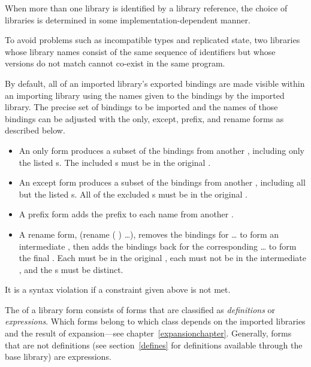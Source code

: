 When more than one library is identified by a library reference, the
choice of libraries is determined in some implementation-dependent manner.

To avoid problems such as incompatible types and replicated state, two
libraries whose library names consist of the same sequence of identifiers but
whose versions do not match cannot co-exist in the same program.

By default, all of an imported library's exported bindings are made
visible within an importing library using the names given to the bindings
by the imported library.
The precise set of bindings to be imported and the names of those
bindings can be adjusted with the {\cf only}, {\cf except},
{\cf prefix}, and {\cf rename} forms as described below.

\begin{itemize}
\item An {\cf only} form produces a subset of the bindings from another
, including only the listed
s.
The included s must be in
the original .
\item An {\cf except} form produces a subset of the bindings from another
, including all but the listed
s.
All of the excluded s must be in
the original .
\item A {\cf prefix} form adds the  prefix to each
name from another .
\item A {\cf rename} form, {\cf (rename ( ) \ldots)},
removes the bindings for {\cf {} \ldots} to form an
intermediate , then adds the bindings back for the
corresponding {\cf {} \ldots} to form the final
.
Each  must be in the original ,
each  must not be in the intermediate ,
and the s must be distinct.
\end{itemize}
It is a syntax violation if a constraint given above is not met.

\label{librarybodysection}
The  of a {\cf library} form consists of forms
that are classified as 
\textit{definitions} or
\textit{expressions}.  Which forms belong to
which class depends on the imported libraries and the result of
expansion---see chapter~\ref{expansionchapter}.  Generally, forms that
are not 
definitions (see section~\ref{defines} for definitions available
through the base library) are expressions.

